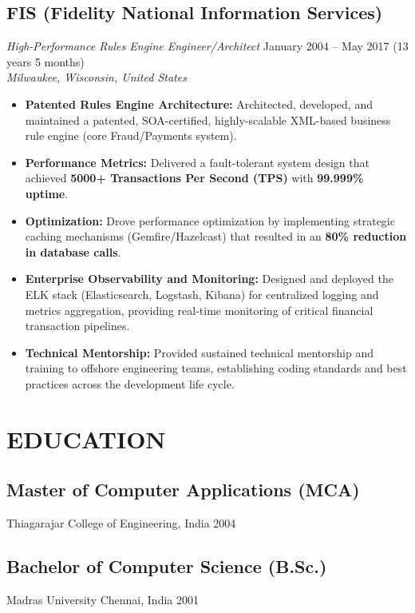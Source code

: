 \documentclass[10pt,letterpaper]{article}
\newcommand{\experience}[5]{
  \subsection*{#1}
  \textit{#2} \hfill #3\\
  \textit{#4} \hfill #5
  \vspace{2pt}
}
\begin{document}
\vspace{6pt}

\experience
  {FIS (Fidelity National Information Services)}
  {High-Performance Rules Engine Engineer/Architect}
  {January 2004 -- May 2017 (13 years 5 months)}
  {Milwaukee, Wisconsin, United States}
  {}

\vspace{-2pt}
\small
\begin{itemize}[leftmargin=12pt,itemsep=2pt,topsep=2pt,parsep=0pt]
  \item \textbf{Patented Rules Engine Architecture:} Architected, developed, and maintained a patented, SOA-certified, highly-scalable XML-based business rule engine (core Fraud/Payments system).
  
  \item \textbf{Performance Metrics:} Delivered a fault-tolerant system design that achieved \textbf{5000+ Transactions Per Second (TPS)} with \textbf{99.999\% uptime}.
  
  \item \textbf{Optimization:} Drove performance optimization by implementing strategic caching mechanisms (Gemfire/Hazelcast) that resulted in an \textbf{80\% reduction in database calls}.
  
  \item \textbf{Enterprise Observability and Monitoring:} Designed and deployed the ELK stack (Elasticsearch, Logstash, Kibana) for centralized logging and metrics aggregation, providing real-time monitoring of critical financial transaction pipelines.
  
  \item \textbf{Technical Mentorship:} Provided sustained technical mentorship and training to offshore engineering teams, establishing coding standards and best practices across the development life cycle.
\end{itemize}

\vspace{6pt}

\section*{EDUCATION}

\subsection*{Master of Computer Applications (MCA)}
Thiagarajar College of Engineering, India \hfill 2004

\vspace{4pt}

\subsection*{Bachelor of Computer Science (B.Sc.)}
Madras University Chennai, India \hfill 2001
\end{document}
